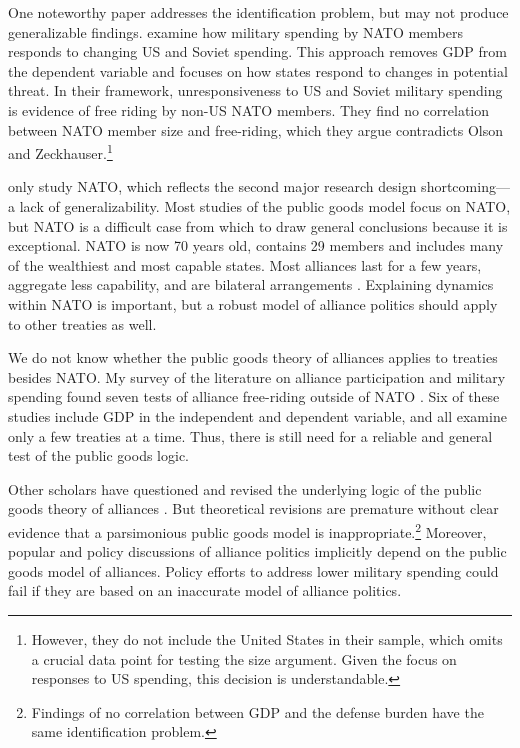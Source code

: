 \documentclass[12pt]{article}
\begin{document}
One noteworthy paper addresses the identification problem, but may not produce generalizable findings. 
\citet{PluemperNeumayer2015} examine how military spending by NATO members responds to changing US and Soviet spending.
This approach removes GDP from the dependent variable and focuses on how states respond to changes in potential threat.  
In their framework, unresponsiveness to US and Soviet military spending is evidence of free riding by non-US NATO members.
They find no correlation between NATO member size and free-riding, which they argue contradicts Olson and Zeckhauser.\footnote{
However, they do not include the United States in their sample, which omits a crucial data point for testing the size argument. Given the focus on responses to US spending, this decision is understandable.}


\citet{PluemperNeumayer2015} only study NATO, which reflects the second major research design shortcoming--- a lack of generalizability. 
Most studies of the public goods model focus on NATO, but NATO is a difficult case from which to draw general conclusions because it is exceptional. 
NATO is now 70 years old, contains 29 members and includes many of the wealthiest and most capable states. 
Most alliances last for a few years, aggregate less capability, and are bilateral arrangements \citep{Leedsetal2002}. 
Explaining dynamics within NATO is important, but a robust model of alliance politics should apply to other treaties as well. 


We do not know whether the public goods theory of alliances applies to treaties besides NATO. 
My survey of the literature on alliance participation and military spending found seven tests of alliance free-riding outside of NATO \citep{Russett1970, Starr1974, Reisinger1983, Thies1987, ConybeareSandler1990, OnealWhatley1996, Siroky2012}. 
Six of these studies include GDP in the independent and dependent variable, and all examine only a few treaties at a time. 
Thus, there is still need for a reliable and general test of the public goods logic. 


Other scholars have questioned and revised the underlying logic of the public goods theory of alliances \citep{Palmer1990, SandlerHartley2001, Norrlof2010}.  
But theoretical revisions are premature without clear evidence that a parsimonious public goods model is inappropriate.\footnote{
Findings of no correlation between GDP and the defense burden have the same identification problem.} 
Moreover, popular and policy discussions of alliance politics implicitly depend on the public goods model of alliances. 
Policy efforts to address lower military spending could fail if they are based on an inaccurate model of alliance politics. 
\end{document}
